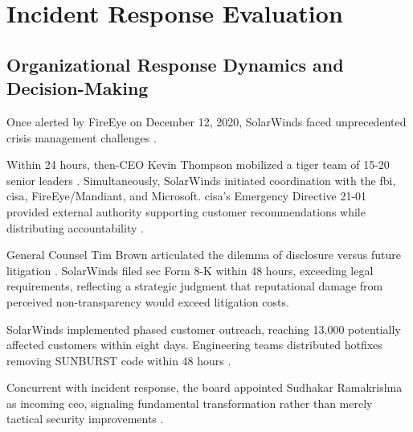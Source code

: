 \section{Incident Response Evaluation}
\label{sec:incident_response}

\subsection{Organizational Response Dynamics and Decision-Making}
Once alerted by FireEye on December 12, 2020, SolarWinds faced unprecedented crisis management challenges \cite{nagle2023}.

 Within 24 hours, then-CEO Kevin Thompson mobilized a tiger team of 15-20 senior leaders \cite{nagle2023}. Simultaneously, SolarWinds initiated coordination with the \gls{fbi}, \gls{cisa}, FireEye/Mandiant, and Microsoft. \gls{cisa}'s Emergency Directive 21-01 provided external authority supporting customer recommendations while distributing accountability \cite{openhearing2021}.

 General Counsel Tim Brown articulated the dilemma of disclosure versus future litigation \cite{nagle2023}. SolarWinds filed \gls{sec} Form 8-K within 48 hours, exceeding legal requirements, reflecting a strategic judgment that reputational damage from perceived non-transparency would exceed litigation costs.

 SolarWinds implemented phased customer outreach, reaching 13,000 potentially affected customers within eight days. Engineering teams distributed hotfixes removing SUNBURST code within 48 hours \cite{nagle2023}.

 Concurrent with incident response, the board appointed Sudhakar Ramakrishna as incoming \gls{ceo}, signaling fundamental transformation rather than merely tactical security improvements \cite{nagle2023}.

